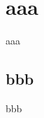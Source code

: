 \documentclass[a4paper,11pt]{jsreport}
\begin{document}

\renewcommand{\bibname}{参考文献} %

\appendix
\renewcommand{\thechapter}{\Alph{chapter}}
\renewcommand{\thesection}{\Alph{chapter}.\arabic{section}}
\setcounter{section}{0}
\renewcommand{\theequation}{\Alph{chapter}.\arabic{equation}}
\setcounter{equation}{0}

\chapter{aaa}
aaa
\section{bbb}
bbb
\end{document}
